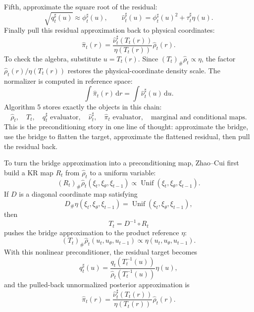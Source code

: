 \documentclass[11pt]{article}
\newcommand{\dd}{\,\mathrm d}
\begin{document}
Fifth, approximate the square root of the residual:
\[
    \sqrt{q_t^\sharp(u)}\approx \phi_t^\sharp(u),
    \qquad
    \widehat\nu_t^\sharp(u)
    =
    \phi_t^\sharp(u)^2+\tau_t^\sharp\eta(u).
    \tag{P7f}
\]
Finally pull this residual approximation back to physical coordinates:
\[
    \widehat\pi_t(r)
    =
    \frac{\widehat\nu_t^\sharp(T_t(r))}
    {\eta(T_t(r))}
    \widehat\rho_t(r).
    \tag{P7g}
\]
To check the algebra, substitute \(u=T_t(r)\).  Since
\((T_t)_\#\widehat\rho_t\propto\eta\), the factor
\(\widehat\rho_t(r)/\eta(T_t(r))\) restores the physical-coordinate density
scale.  The normalizer is computed in reference space:
\[
    \int \widehat\pi_t(r)\dd r
    =
    \int \widehat\nu_t^\sharp(u)\dd u.
    \tag{P7h}
\]
Algorithm 5 stores exactly the objects in this chain:
\[
    \widehat\rho_t,\quad T_t,\quad q_t^\sharp\text{ evaluator},\quad
    \widehat\nu_t^\sharp,\quad \widehat\pi_t\text{ evaluator},\quad
    \text{marginal and conditional maps}.
    \tag{P7i}
\]
This is the preconditioning story in one line of thought: approximate the
bridge, use the bridge to flatten the target, approximate the flattened
residual, then pull the residual back.

To turn the bridge approximation into a preconditioning map, Zhao--Cui first
build a KR map \(R_t\) from \(\widehat\rho_t\) to a uniform variable:
\[
    (R_t)_\#\widehat\rho_t(\xi_t,\xi_\theta,\xi_{t-1})
    \propto
    \operatorname{Unif}(\xi_t,\xi_\theta,\xi_{t-1}).
    \tag{P8}
\]
If \(D\) is a diagonal coordinate map satisfying
\[
    D_\#\eta(\xi_t,\xi_\theta,\xi_{t-1})
    =
    \operatorname{Unif}(\xi_t,\xi_\theta,\xi_{t-1}),
    \tag{P9}
\]
then
\[
    T_t=D^{-1}\circ R_t
    \tag{P10}
\]
pushes the bridge approximation to the product reference \(\eta\):
\[
    (T_t)_\#\widehat\rho_t(u_t,u_\theta,u_{t-1})
    \propto
    \eta(u_t,u_\theta,u_{t-1}).
    \tag{P11}
\]
With this nonlinear preconditioner, the residual target becomes
\[
    q^\sharp_t(u)
    =
    \frac{q_t(T_t^{-1}(u))}
    {\widehat\rho_t(T_t^{-1}(u))}
    \eta(u),
    \tag{P12}
\]
and the pulled-back unnormalized posterior approximation is
\[
    \widehat\pi_t(r)
    =
    \frac{\widehat\nu^\sharp_t(T_t(r))}
    {\eta(T_t(r))}
    \widehat\rho_t(r).
    \tag{P13}
\]
\end{document}
